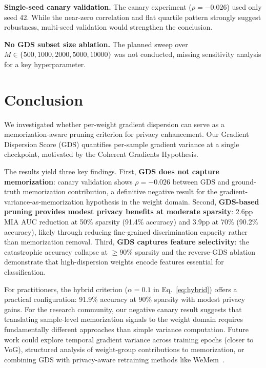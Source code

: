 \documentclass{article}
\begin{document}
\textbf{Single-seed canary validation.} The canary experiment ($\rho = -0.026$) used only seed 42. While the near-zero correlation and flat quartile pattern strongly suggest robustness, multi-seed validation would strengthen the conclusion.

\textbf{No GDS subset size ablation.} The planned sweep over $M \in \{500, 1000, 2000, 5000, 10000\}$ was not conducted, missing sensitivity analysis for a key hyperparameter.

\section{Conclusion}
\label{sec:conclusion}

We investigated whether per-weight gradient dispersion can serve as a memorization-aware pruning criterion for privacy enhancement. Our Gradient Dispersion Score (GDS) quantifies per-sample gradient variance at a single checkpoint, motivated by the Coherent Gradients Hypothesis.

The results yield three key findings. First, \textbf{GDS does not capture memorization}: canary validation shows $\rho = -0.026$ between GDS and ground-truth memorization contribution, a definitive negative result for the gradient-variance-as-memorization hypothesis in the weight domain. Second, \textbf{GDS-based pruning provides modest privacy benefits at moderate sparsity}: 2.6pp MIA AUC reduction at 50\% sparsity (91.4\% accuracy) and 3.9pp at 70\% (90.2\% accuracy), likely through reducing fine-grained discrimination capacity rather than memorization removal. Third, \textbf{GDS captures feature selectivity}: the catastrophic accuracy collapse at $\geq$90\% sparsity and the reverse-GDS ablation demonstrate that high-dispersion weights encode features essential for classification.

For practitioners, the hybrid criterion ($\alpha = 0.1$ in Eq.~\ref{eq:hybrid}) offers a practical configuration: 91.9\% accuracy at 90\% sparsity with modest privacy gains. For the research community, our negative canary result suggests that translating sample-level memorization signals to the weight domain requires fundamentally different approaches than simple variance computation. Future work could explore temporal gradient variance across training epochs (closer to VoG), structured analysis of weight-group contributions to memorization, or combining GDS with privacy-aware retraining methods like WeMem~\citep{shang2025wemem}.



\end{document}
